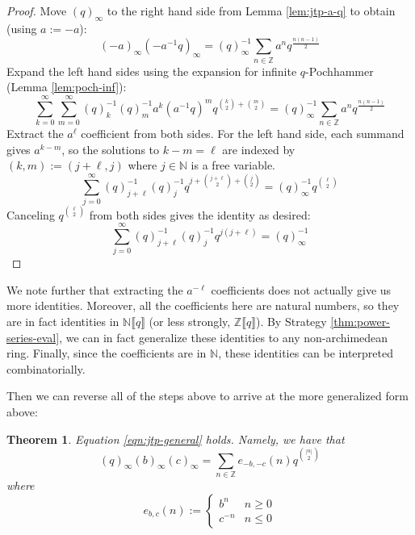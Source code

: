 \documentclass[12pt]{amsart}
\newtheorem{theorem}{Theorem}[subsection]
\theoremstyle{definition}
\theoremstyle{remark}
\numberwithin{equation}{subsection}
\newcommand{\N}{\mathbb N}
\newcommand{\ps}[1]{\llbracket #1 \rrbracket} %
\newcommand{\Z}{\mathbb Z}
\begin{document}
\begin{proof}
    Move $(q)_\infty$ to the right hand side from Lemma \ref{lem:jtp-a-q} to obtain (using $a := -a$):
    \begin{equation}
        (-a)_\infty (-a^{-1}q)_\infty = (q)_\infty^{-1} \sum_{n \in \Z} a^n q^{\frac{n(n-1)}2}
    \end{equation}
    Expand the left hand sides using the expansion for infinite $q$-Pochhammer (Lemma \ref{lem:poch-inf}):
    \begin{equation}
        \sum_{k=0}^\infty \sum_{m=0}^\infty (q)_k^{-1} (q)_m^{-1} a^k (a^{-1} q)^m q^{\binom{k}{2} + \binom{m}{2}} = (q)_\infty^{-1} \sum_{n \in \Z} a^n q^{\frac{n(n-1)}2}
    \end{equation}
    Extract the $a^\ell$ coefficient from both sides. For the left hand side, each summand gives $a^{k-m}$, so the solutions to $k-m = \ell$ are indexed by $(k,m) := (j+\ell, j)$ where $j \in \N$ is a free variable.
    \begin{equation}
        \sum_{j=0}^\infty (q)_{j+\ell}^{-1} (q)_j^{-1} q^{j + \binom{j+\ell}{2} + \binom{j}{2}} = (q)_\infty^{-1} q^{\binom{\ell}{2}}
    \end{equation}
    Canceling $q^{\binom{\ell}{2}}$ from both sides gives the identity as desired:
    \begin{equation}
        \sum_{j=0}^\infty (q)_{j+\ell}^{-1} (q)_j^{-1} q^{j(j+\ell)} = (q)_\infty^{-1}
    \end{equation}
\end{proof}

We note further that extracting the $a^{-\ell}$ coefficients does not actually give us more identities. Moreover, all the coefficients here are natural numbers, so they are in fact identities in $\N\ps{q}$ (or less strongly, $\Z\ps{q}$). By Strategy \ref{thm:power-series-eval}, we can in fact generalize these identities to any non-archimedean ring. Finally, since the coefficients are in $\N$, these identities can be interpreted combinatorially.

Then we can reverse all of the steps above to arrive at the more generalized form above:
\begin{theorem}
    \label{thm:jtp-general}
    Equation \ref{eqn:jtp-general} holds. Namely, we have that
    \begin{equation}(q)_\infty (b)_\infty (c)_\infty = \sum_{n \in \Z} e_{-b,-c}(n) q^{\binom{|n|}{2}}\end{equation}
    where
    \begin{equation}e_{b,c}(n) := \begin{cases} b^n & n \ge 0 \\ c^{-n} & n \le 0 \end{cases}\end{equation}
\end{theorem}
\end{document}
